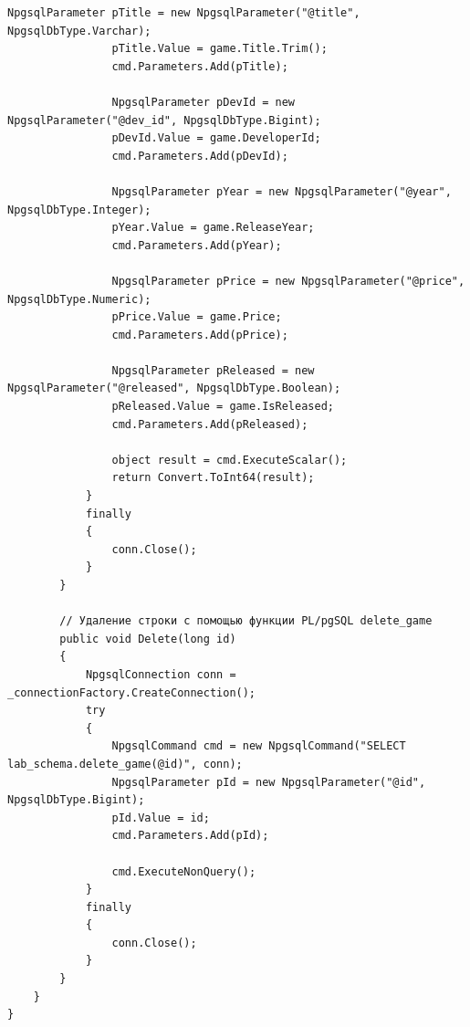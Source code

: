 \documentclass[oneside,a4paper,14pt]{extarticle}
\begin{document}
\begin{lstlisting}[language={[Sharp]C}]
                NpgsqlParameter pTitle = new NpgsqlParameter("@title", NpgsqlDbType.Varchar);
                pTitle.Value = game.Title.Trim();
                cmd.Parameters.Add(pTitle);

                NpgsqlParameter pDevId = new NpgsqlParameter("@dev_id", NpgsqlDbType.Bigint);
                pDevId.Value = game.DeveloperId;
                cmd.Parameters.Add(pDevId);

                NpgsqlParameter pYear = new NpgsqlParameter("@year", NpgsqlDbType.Integer);
                pYear.Value = game.ReleaseYear;
                cmd.Parameters.Add(pYear);

                NpgsqlParameter pPrice = new NpgsqlParameter("@price", NpgsqlDbType.Numeric);
                pPrice.Value = game.Price;
                cmd.Parameters.Add(pPrice);

                NpgsqlParameter pReleased = new NpgsqlParameter("@released", NpgsqlDbType.Boolean);
                pReleased.Value = game.IsReleased;
                cmd.Parameters.Add(pReleased);

                object result = cmd.ExecuteScalar();
                return Convert.ToInt64(result);
            }
            finally
            {
                conn.Close();
            }
        }

        // Удаление строки с помощью функции PL/pgSQL delete_game
        public void Delete(long id)
        {
            NpgsqlConnection conn = _connectionFactory.CreateConnection();
            try
            {
                NpgsqlCommand cmd = new NpgsqlCommand("SELECT lab_schema.delete_game(@id)", conn);
                NpgsqlParameter pId = new NpgsqlParameter("@id", NpgsqlDbType.Bigint);
                pId.Value = id;
                cmd.Parameters.Add(pId);

                cmd.ExecuteNonQuery();
            }
            finally
            {
                conn.Close();
            }
        }
    }
}
	\end{lstlisting}
	
\end{document}

